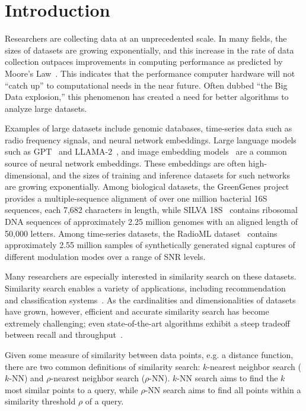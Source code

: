 \section{Introduction}
\label{sec:introduction}

Researchers are collecting data at an unprecedented scale.
In many fields, the sizes of datasets are growing exponentially, and this increase in the rate of data collection outpaces improvements in computing performance as predicted by Moore's Law~\cite{kahn2011future}.
This indicates that the performance computer hardware will not ``catch up'' to computational needs in the near future.
Often dubbed ``the Big Data explosion,'' this phenomenon has created a need for better algorithms to analyze large datasets.

Examples of large datasets include genomic databases, time-series data such as radio frequency signals, and neural network embeddings.
Large language models such as GPT~\cite{2020arXiv200514165B, OpenAI2023GPT4TR} and LLAMA-2~\cite{Touvron2023Llama2O}, and image embedding models~\cite{radford2021learning, dosovitskiy2020image} are a common source of neural network embeddings.
These embeddings are often high-dimensional, and the sizes of training and inference datasets for such networks are growing exponentially.
Among biological datasets, the GreenGenes project~\cite{desantis2006greengenes} provides a multiple-sequence alignment of over one million bacterial 16S sequences, each 7,682 characters in length, while SILVA 18S~\cite{10.1093/nar/gks1219} contains ribosomal DNA sequences of approximately 2.25 million genomes with an aligned length of 50,000 letters.
Among time-series datasets, the RadioML dataset~\cite{oshea2018radioml} contains approximately 2.55 million samples of synthetically generated signal captures of different modulation modes over a range of SNR levels.

Many researchers are especially interested in similarity search on these datasets. 
Similarity search enables a variety of applications, including recommendation~\cite{annoy} and classification systems~\cite{suyanto2022knnclassifier}. 
As the cardinalities and dimensionalities of datasets have grown, however, efficient and accurate similarity search has become extremely challenging; 
even state-of-the-art algorithms exhibit a steep tradeoff between recall and throughput~\cite{Malkov2016EfficientAR, johnson2019billion, annoy, aumuller2020ann}.

Given some measure of similarity between data points, e.g. a distance function, there are two common definitions of similarity search: $k$-nearest neighbor search ($k$-NN) and $\rho$-nearest neighbor search ($\rho$-NN).
$k$-NN search aims to find the $k$ most similar points to a query, while $\rho$-NN search aims to find all points within a similarity threshold $\rho$ of a query.

